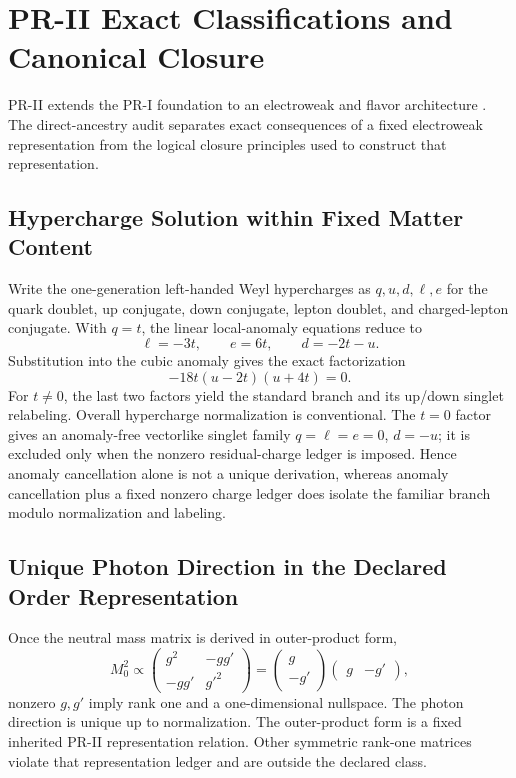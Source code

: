 \section{PR-II Exact Classifications and Canonical Closure}
\label{sec:pr2-branch-classification}

PR-II extends the PR-I foundation to an electroweak and flavor architecture \cite{PRII}.  The direct-ancestry audit separates exact consequences of a fixed electroweak representation from the logical closure principles used to construct that representation.

\subsection{Hypercharge Solution within Fixed Matter Content}

Write the one-generation left-handed Weyl hypercharges \cite{Weinberg_QFT_1996} as $q,u,d,\ell,e$ for the quark doublet, up conjugate, down conjugate, lepton doublet, and charged-lepton conjugate.  With $q=t$, the linear local-anomaly equations reduce to
\begin{equation}
 \ell=-3t,\qquad e=6t,\qquad d=-2t-u.
\end{equation}
Substitution into the cubic anomaly gives the exact factorization
\begin{equation}
 -18t(u-2t)(u+4t)=0.
 \label{eq:pr35-hypercharge-factorization}
\end{equation}
For $t\ne0$, the last two factors yield the standard branch and its up/down singlet relabeling.  Overall hypercharge normalization is conventional.  The $t=0$ factor gives an anomaly-free vectorlike singlet family $q=\ell=e=0$, $d=-u$; it is excluded only when the nonzero residual-charge ledger is imposed.  Hence anomaly cancellation alone is not a unique derivation, whereas anomaly cancellation plus a fixed nonzero charge ledger does isolate the familiar branch modulo normalization and labeling.

\subsection{Unique Photon Direction in the Declared Order Representation}

Once the neutral mass matrix is derived in outer-product form,
\begin{equation}
 M_0^2\propto
 \begin{pmatrix}g^2&-gg'\\-gg'&g'^2\end{pmatrix}
 =\begin{pmatrix}g\\-g'\end{pmatrix}
  \begin{pmatrix}g&-g'\end{pmatrix},
\end{equation}
nonzero $g,g'$ imply rank one and a one-dimensional nullspace.  The photon direction is unique up to normalization.  The outer-product form is a fixed inherited PR-II representation relation.  Other symmetric rank-one matrices violate that representation ledger and are outside the declared class.

